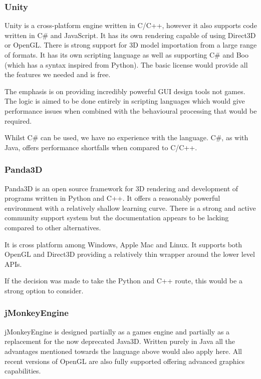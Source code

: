 \subsubsection{Unity}

Unity is a cross-platform engine written in C/C++, however it also
supports code written in C\# and JavaScript. It has its own rendering
capable of using Direct3D or OpenGL. There is strong support for 3D
model importation from a large range of formats. It has its own scripting
language as well as supporting C\# and Boo (which has a syntax inspired
from Python). The basic license would provide all the features we
needed and is free.

The emphasis is on providing incredibly powerful
GUI design tools not games. The logic is aimed to be done
entirely in scripting languages which would give performance issues
when combined with the behavioural processing that would be required.

Whilst C\# can be used, we have no experience with the language. C\#, as with
Java, offers performance shortfalls when compared to C/C++.


\subsubsection{Panda3D}

Panda3D is an open source framework for 3D rendering and development
of programs written in Python and C++. It offers a reasonably powerful
environment with a relatively shallow learning curve. There is a strong
and active community support system but the documentation appears
to be lacking compared to other alternatives.

It is cross platform among Windows, Apple Mac and Linux.
It supports both OpenGL and Direct3D providing a relatively thin wrapper
around the lower level APIs.

If the decision was made to take the Python and C++ route, this would be a strong
option to consider.


\subsubsection{jMonkeyEngine}

jMonkeyEngine is designed partially as a games engine and partially as a
replacement for the now deprecated Java3D. Written purely in Java
all the advantages mentioned towards the language above would also
apply here. All recent versions of OpenGL are also fully supported
offering advanced graphics capabilities.

